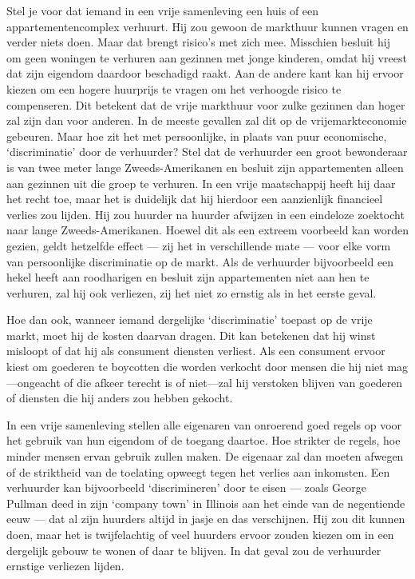 \documentclass[
  a5paper,
  smalldemyvopaper,10pt,twoside,onecolumn,openright,extrafontsizes,hidelinks]{memoir}
\begin{document}
Stel je voor dat iemand in een vrije samenleving een huis of een
appartementencomplex verhuurt. Hij zou gewoon de markthuur kunnen vragen
en verder niets doen. Maar dat brengt risico's met zich mee. Misschien
besluit hij om geen woningen te verhuren aan gezinnen met jonge
kinderen, omdat hij vreest dat zijn eigendom daardoor beschadigd raakt.
Aan de andere kant kan hij ervoor kiezen om een hogere huurprijs te
vragen om het verhoogde risico te compenseren. Dit betekent dat de vrije
markthuur voor zulke gezinnen dan hoger zal zijn dan voor anderen. In de
meeste gevallen zal dit op de vrijemarkteconomie gebeuren. Maar hoe zit
het met persoonlijke, in plaats van puur economische, `discriminatie'
door de verhuurder? Stel dat de verhuurder een groot bewonderaar is van
twee meter lange Zweeds-Amerikanen en besluit zijn appartementen alleen
aan gezinnen uit die groep te verhuren. In een vrije maatschappij heeft
hij daar het recht toe, maar het is duidelijk dat hij hierdoor een
aanzienlijk financieel verlies zou lijden. Hij zou huurder na huurder
afwijzen in een eindeloze zoektocht naar lange Zweeds-Amerikanen. Hoewel
dit als een extreem voorbeeld kan worden gezien, geldt hetzelfde effect
--- zij het in verschillende mate --- voor elke vorm van persoonlijke
discriminatie op de markt. Als de verhuurder bijvoorbeeld een hekel
heeft aan roodharigen en besluit zijn appartementen niet aan hen te
verhuren, zal hij ook verliezen, zij het niet zo ernstig als in het
eerste geval.

Hoe dan ook, wanneer iemand dergelijke `discriminatie' toepast op de
vrije markt, moet hij de kosten daarvan dragen. Dit kan betekenen dat
hij winst misloopt of dat hij als consument diensten verliest. Als een
consument ervoor kiest om goederen te boycotten die worden verkocht door
mensen die hij niet mag---ongeacht of die afkeer terecht is of
niet---zal hij verstoken blijven van goederen of diensten die hij anders
zou hebben gekocht.

In een vrije samenleving stellen alle eigenaren van onroerend goed
regels op voor het gebruik van hun eigendom of de toegang daartoe. Hoe
strikter de regels, hoe minder mensen ervan gebruik zullen maken. De
eigenaar zal dan moeten afwegen of de striktheid van de toelating
opweegt tegen het verlies aan inkomsten. Een verhuurder kan bijvoorbeeld
`discrimineren' door te eisen --- zoals George Pullman deed in zijn
`company town' in Illinois aan het einde van de negentiende eeuw --- dat
al zijn huurders altijd in jasje en das verschijnen. Hij zou dit kunnen
doen, maar het is twijfelachtig of veel huurders ervoor zouden kiezen om
in een dergelijk gebouw te wonen of daar te blijven. In dat geval zou de
verhuurder ernstige verliezen lijden.
\end{document}
